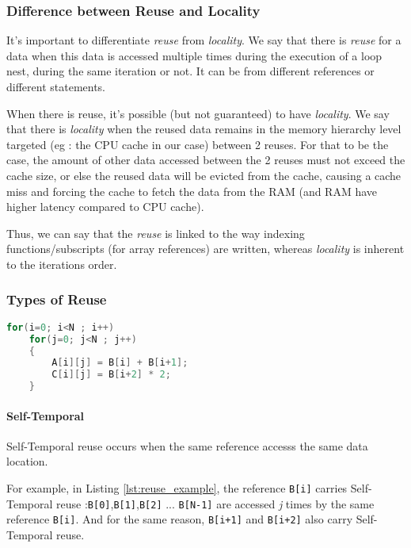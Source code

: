 \documentclass[paper=a4, fontsize=11.5pt]{scrartcl}
\numberwithin{equation}{section}        %
\numberwithin{figure}{section}          %
\numberwithin{table}{section}               %
\begin{document}
        \subsubsection{Difference between Reuse and Locality}
            It's important to differentiate \textit{reuse} from \textit{locality}.
            We say that there is \textit{reuse} for a data when this data is
            accessed multiple times during the execution of a loop nest, during
            the same iteration or not. It can be from different references or different statements.
            
            When there is reuse, it's possible (but not guaranteed) to have
            \textit{locality}. We say that there is \textit{locality} when the
            reused data remains in the memory hierarchy level targeted 
            (eg : the CPU cache in our case) between 2 reuses.
            For that to be the case, the amount of other data accessed between the
            2 reuses must not exceed the cache size, or else the reused data will be
            evicted from the cache, causing a cache miss and forcing the cache
            to fetch the data from the RAM (and RAM have higher latency compared to CPU cache).


            Thus, we can say that the \textit{reuse} is linked to the way indexing
            functions/subscripts (for array references) are written, whereas \textit{locality} is
            inherent to the iterations order.

\medskip

        \subsubsection{Types of Reuse}
            
\begin{lstlisting}[frame=single, language=C, caption=Reuse example, label={lst:reuse_example}]
for(i=0; i<N ; i++)
    for(j=0; j<N ; j++)
    {
        A[i][j] = B[i] + B[i+1];
        C[i][j] = B[i+2] * 2;
    }
\end{lstlisting}

            \paragraph{Self-Temporal}
                Self-Temporal reuse occurs when the same reference accesss the same
                data location.
                
                For example, in Listing \ref{lst:reuse_example}, the reference \verb'B[i]' carries Self-Temporal
                reuse :\verb'B[0]',\verb'B[1]',\verb'B[2]' ... \verb'B[N-1]' are accessed
                \textit{j} times by the same reference \verb'B[i]'.
                And for the same reason, \verb'B[i+1]' and \verb'B[i+2]' also carry Self-Temporal reuse.
\end{document}

